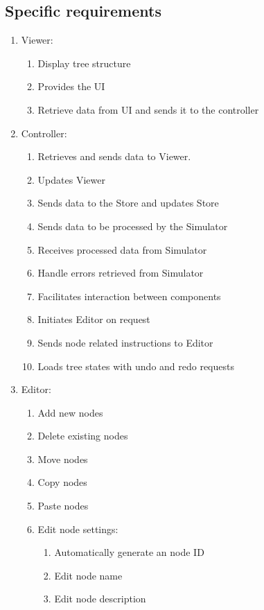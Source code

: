 \documentclass[12pt]{article}
\begin{document}
    \subsection{Specific requirements}
    \begin{enumerate}
    \item Viewer:
      \begin{enumerate}
        \item Display tree structure
        \item Provides the UI
        \item Retrieve data from UI and sends it to the controller
      \end{enumerate}
      \item Controller:
      \begin{enumerate}
        \item Retrieves and sends data to Viewer.
        \item Updates Viewer
        \item Sends data to the Store and updates Store
        \item Sends data to be processed by the Simulator
        \item Receives processed data from Simulator
        \item Handle errors retrieved from Simulator
        \item Facilitates interaction between components
        \item Initiates Editor on request
        \item Sends node related instructions to Editor
        \item Loads tree states with undo and redo requests
      \end{enumerate}
      \item Editor:
      \begin{enumerate}
        \item Add new nodes
        \item Delete existing nodes
        \item Move nodes
        \item Copy nodes
        \item Paste nodes
        \item Edit node settings:
        \begin{enumerate}
          \item Automatically generate an node ID
          \item Edit node name
          \item Edit node description

\end{enumerate}
\end{enumerate}
\end{enumerate}
\end{document}
